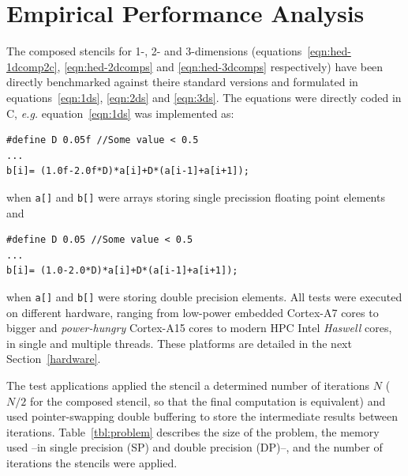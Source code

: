 \documentclass{acm_proc_article-sp}
\begin{document}
\section{Empirical Performance Analysis}
\label{performance}
The composed stencils for 1-, 2- and 3-dimensions (equations~\eqref{eqn:hed-1dcomp2c}, \eqref{eqn:hed-2dcomps} and \eqref{eqn:hed-3dcomps} respectively) have been directly benchmarked against theire standard versions and formulated in equations~\eqref{eqn:1ds}, \eqref{eqn:2ds} and \eqref{eqn:3ds}. The equations were directly coded in C, \textit{e.g.} equation~\eqref{eqn:1ds} was implemented as:
\begin{lstlisting}
#define D 0.05f //Some value < 0.5
...
b[i]= (1.0f-2.0f*D)*a[i]+D*(a[i-1]+a[i+1]);
\end{lstlisting}
when \texttt{a[]} and \texttt{b[]} were arrays storing single precission floating point elements and
\begin{lstlisting}
#define D 0.05 //Some value < 0.5
...
b[i]= (1.0-2.0*D)*a[i]+D*(a[i-1]+a[i+1]);
\end{lstlisting}
when \texttt{a[]} and \texttt{b[]} were storing double precision elements. All tests were executed on different hardware, ranging from low-power embedded Cortex-A7 cores to bigger and \textit{power-hungry} Cortex-A15 cores to modern HPC Intel \textit{Haswell} cores, in single and multiple threads. These platforms are detailed in the next Section~\ref{hardware}.

The test applications applied the stencil a determined number of iterations $N$ ($N/2$ for the composed stencil, so that the final computation is equivalent) and used pointer-swapping double buffering to store the intermediate results between iterations. Table~\ref{tbl:problem} describes the size of the problem, the memory used --in single precision (SP) and double precision (DP)--, and the number of iterations the stencils were applied.
\end{document}
